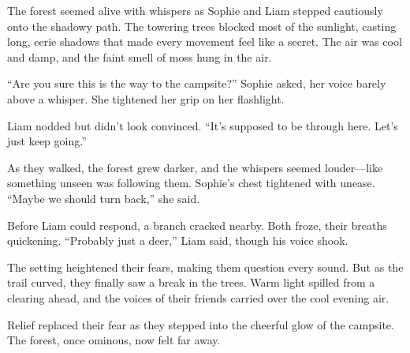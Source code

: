 \documentclass[12pt]{article}
\begin{document}
\begin{tcolorbox}[colframe=black!60, colback=white, 
coltitle=black, colbacktitle=black!15, fonttitle=\bfseries\Large, 
title=Text: The Whispering Forest, halign title=center, left=10pt, right=10pt, top=10pt, bottom=15pt]

The forest seemed alive with whispers as Sophie and Liam stepped cautiously onto the shadowy path. The towering trees blocked most of the sunlight, casting long, eerie shadows that made every movement feel like a secret. The air was cool and damp, and the faint smell of moss hung in the air. 

“Are you sure this is the way to the campsite?” Sophie asked, her voice barely above a whisper. She tightened her grip on her flashlight.

Liam nodded but didn’t look convinced. “It’s supposed to be through here. Let’s just keep going.”

As they walked, the forest grew darker, and the whispers seemed louder—like something unseen was following them. Sophie’s chest tightened with unease. “Maybe we should turn back,” she said.

Before Liam could respond, a branch cracked nearby. Both froze, their breaths quickening. “Probably just a deer,” Liam said, though his voice shook. 

The setting heightened their fears, making them question every sound. But as the trail curved, they finally saw a break in the trees. Warm light spilled from a clearing ahead, and the voices of their friends carried over the cool evening air.

Relief replaced their fear as they stepped into the cheerful glow of the campsite. The forest, once ominous, now felt far away.

\end{tcolorbox}

\vspace{1em}
\end{document}

